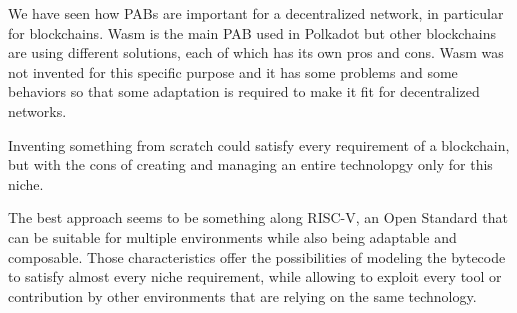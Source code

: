 We have seen how PABs are important for a decentralized network, in particular for blockchains. Wasm is the main PAB used in Polkadot but other blockchains are using different solutions, each of which has its own pros and cons.  Wasm was not invented for this specific purpose and it has some problems and some behaviors so that some adaptation is required to make it fit for decentralized networks.

Inventing something from scratch could satisfy every requirement of a blockchain, but with the cons of creating and managing an entire technolopgy only for this niche.

The best approach seems to be something along RISC-V, an Open Standard that can be suitable for multiple environments while also being adaptable and composable. Those characteristics offer the possibilities of modeling the bytecode to  satisfy almost every niche requirement, while allowing to exploit every tool or contribution by other environments that are relying on the same technology.
